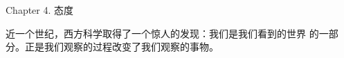 


\beginchapter Chapter 4. 态度


{
\parindent=3pc
\noindent\hang{}
\1%
{近一个世纪}，西方科学取得了一个惊人的发现：我们是我们看到的世界
的一部分。正是我们观察的过程改变了我们观察的事物。

}


\endchapter

\byebye
